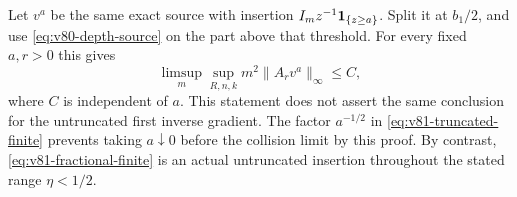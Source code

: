 Let $v^a$ be the same exact source with insertion
$I_m z^{-1}\mathbf1_{\{z\ge a\}}$. Split it at $b_1/2$, and use
\eqref{eq:v80-depth-source} on the part above that threshold.
For every fixed $a,r>0$ this gives
\begin{equation}\label{eq:v81-full-truncation}
             \limsup_m\sup_{R,n,k}m^2\|A_rv^a\|_\infty\le C,
\end{equation}
where $C$ is independent of $a$. This statement does not assert the
same conclusion for the untruncated first inverse gradient. The
factor $a^{-1/2}$ in \eqref{eq:v81-truncated-finite} prevents taking
$a\downarrow0$ before the collision limit by this proof. By contrast,
\eqref{eq:v81-fractional-finite} is an actual untruncated insertion
throughout the stated range $\eta<1/2$.
